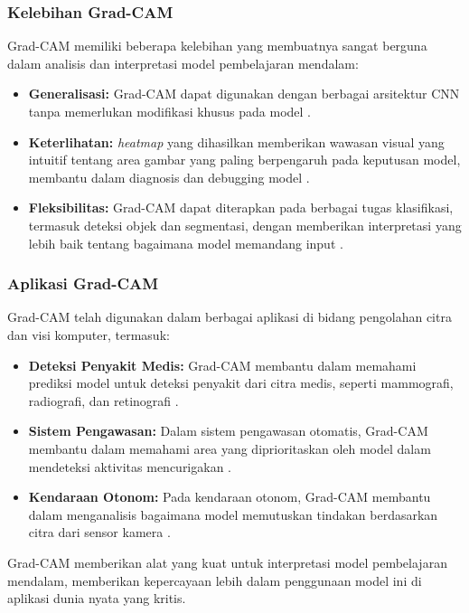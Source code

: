 \subsubsection{Kelebihan Grad-CAM}

Grad-CAM memiliki beberapa kelebihan yang membuatnya sangat berguna dalam analisis dan interpretasi model pembelajaran mendalam:

\begin{itemize}
    \item \textbf{Generalisasi:} Grad-CAM dapat digunakan dengan berbagai arsitektur CNN tanpa memerlukan modifikasi khusus pada model \parencite{selvaraju2017grad}.
    \item \textbf{Keterlihatan:} \emph{heatmap} yang dihasilkan memberikan wawasan visual yang intuitif tentang area gambar yang paling berpengaruh pada keputusan model, membantu dalam diagnosis dan debugging model \parencite{selvaraju2017grad}.
    \item \textbf{Fleksibilitas:} Grad-CAM dapat diterapkan pada berbagai tugas klasifikasi, termasuk deteksi objek dan segmentasi, dengan memberikan interpretasi yang lebih baik tentang bagaimana model memandang input \parencite{selvaraju2017grad}.
\end{itemize}

\subsubsection{Aplikasi Grad-CAM}

Grad-CAM telah digunakan dalam berbagai aplikasi di bidang pengolahan citra dan visi komputer, termasuk:

\begin{itemize}
    \item \textbf{Deteksi Penyakit Medis:} Grad-CAM membantu dalam memahami prediksi model untuk deteksi penyakit dari citra medis, seperti mammografi, radiografi, dan retinografi \parencite{selvaraju2017grad}.
    \item \textbf{Sistem Pengawasan:} Dalam sistem pengawasan otomatis, Grad-CAM membantu dalam memahami area yang diprioritaskan oleh model dalam mendeteksi aktivitas mencurigakan \parencite{selvaraju2017grad}.
    \item \textbf{Kendaraan Otonom:} Pada kendaraan otonom, Grad-CAM membantu dalam menganalisis bagaimana model memutuskan tindakan berdasarkan citra dari sensor kamera \parencite{selvaraju2017grad}.
\end{itemize}

Grad-CAM memberikan alat yang kuat untuk interpretasi model pembelajaran mendalam, memberikan kepercayaan lebih dalam penggunaan model ini di aplikasi dunia nyata yang kritis.

